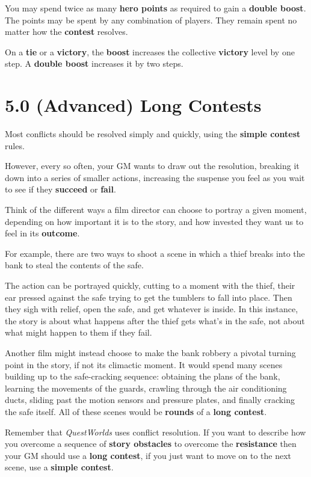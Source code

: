 \documentclass[
]{article}
\begin{document}
You may spend twice as many \textbf{hero points} as required to gain a
\textbf{double boost}. The points may be spent by any combination of
players. They remain spent no matter how the \textbf{contest} resolves.

On a \textbf{tie} or a \textbf{victory}, the \textbf{boost} increases
the collective \textbf{victory} level by one step. A \textbf{double
boost} increases it by two steps.

\hypertarget{advanced-long-contests}{%
\section{5.0 (Advanced) Long Contests}\label{advanced-long-contests}}

Most conflicts should be resolved simply and quickly, using the
\textbf{simple contest} rules.

However, every so often, your GM wants to draw out the resolution,
breaking it down into a series of smaller actions, increasing the
suspense you feel as you wait to see if they \textbf{succeed} or
\textbf{fail}.

Think of the different ways a film director can choose to portray a
given moment, depending on how important it is to the story, and how
invested they want us to feel in its \textbf{outcome}.

For example, there are two ways to shoot a scene in which a thief breaks
into the bank to steal the contents of the safe.

The action can be portrayed quickly, cutting to a moment with the thief,
their ear pressed against the safe trying to get the tumblers to fall
into place. Then they sigh with relief, open the safe, and get whatever
is inside. In this instance, the story is about what happens after the
thief gets what's in the safe, not about what might happen to them if
they fail.

Another film might instead choose to make the bank robbery a pivotal
turning point in the story, if not its climactic moment. It would spend
many scenes building up to the safe-cracking sequence: obtaining the
plans of the bank, learning the movements of the guards, crawling
through the air conditioning ducts, sliding past the motion sensors and
pressure plates, and finally cracking the safe itself. All of these
scenes would be \textbf{rounds} of a \textbf{long contest}.

Remember that \emph{QuestWorlds} uses conflict resolution. If you want
to describe how you overcome a sequence of \textbf{story obstacles} to
overcome the \textbf{resistance} then your GM should use a \textbf{long
contest}, if you just want to move on to the next scene, use a
\textbf{simple contest}.
\end{document}
